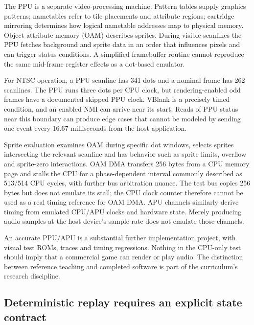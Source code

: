 \hypertarget{06-engine-ii-ch042-rendering-time-is-not-the-same-clock-as-cpu-time}{}

The PPU is a separate video-processing machine. Pattern tables supply graphics patterns; nametables refer to tile placements and attribute regions; cartridge mirroring determines how logical nametable addresses map to physical memory. Object attribute memory (OAM) describes sprites. During visible scanlines the PPU fetches background and sprite data in an order that influences pixels and can trigger status conditions. A simplified framebuffer routine cannot reproduce the same mid-frame register effects as a dot-based emulator.

For NTSC operation, a PPU scanline has 341 dots and a nominal frame has 262 scanlines. The PPU runs three dots per CPU clock, but rendering-enabled odd frames have a documented skipped PPU clock. VBlank is a precisely timed condition, and an enabled NMI can arrive near its start. Reads of PPU status near this boundary can produce edge cases that cannot be modeled by sending one event every 16.67 milliseconds from the host application.

Sprite evaluation examines OAM during specific dot windows, selects sprites intersecting the relevant scanline and has behavior such as sprite limits, overflow and sprite-zero interactions. OAM DMA transfers 256 bytes from a CPU memory page and stalls the CPU for a phase-dependent interval commonly described as 513/514 CPU cycles, with further bus arbitration nuance. The test bus copies 256 bytes but does not emulate its stall; the CPU clock counter therefore cannot be used as a real timing reference for OAM DMA. APU channels similarly derive timing from emulated CPU/APU clocks and hardware state. Merely producing audio samples at the host device's sample rate does not emulate those channels.

An accurate PPU/APU is a substantial further implementation project, with visual test ROMs, traces and timing regressions. Nothing in the CPU-only test should imply that a commercial game can render or play audio. The distinction between reference teaching and completed software is part of the curriculum's research discipline.

\subsection{Deterministic replay requires an explicit state contract}\label{06-engine-ii-ch042-deterministic-replay-requires-an-explicit-state-contract}

